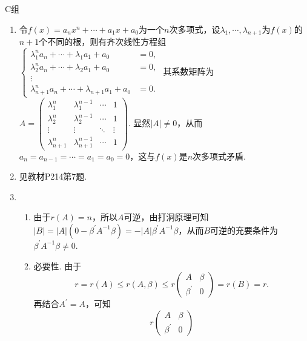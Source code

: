 \centerline{\heiti C组}
\begin{enumerate}
    \item
        令$f(x)=a_nx^n+\cdots+a_1x+a_0$为一个$n$次多项式，设$\lambda_1,\cdots,\lambda_{n+1}$为$f(x)$的$n+1$个不同的根，则有齐次线性方程组
        $\left\{\begin{array}{cl}
            \lambda_1^n a_n+\cdots+\lambda_1a_1+a_0&=0, \\
            \lambda_2^n a_n+\cdots+\lambda_2a_1+a_0&=0, \\
            \vdots& \\
            \lambda_{n+1}^n a_n+\cdots+\lambda_{n+1}a_1+a_0&=0.
        \end{array}\right.$
        其系数矩阵为
            $A=\begin{pmatrix}
                \lambda_1^n & \lambda_1^{n-1} & \cdots & 1 \\
                \lambda_2^n & \lambda_2^{n-1} & \cdots & 1 \\
                \vdots & \vdots & \ddots & \vdots \\
                \lambda_{n+1}^n & \lambda_{n+1}^{n-1} & \cdots & 1
            \end{pmatrix}$.
        显然$|A|\neq 0$，从而$a_n=a_{n-1}=\cdots=a_1=a_0=0$，这与$f(x)$是$n$次多项式矛盾.
    \item 见教材P214第7题.
    \item
        \begin{enumerate}
            \item
                由于$r(A)=n$，所以$A$可逆，由打洞原理可知$|B|=|A|(0-\beta^\prime A^{-1}\beta)=-|A|\beta^\prime A^{-1}\beta$，从而$B$可逆的充要条件为$\beta^\prime A^{-1}\beta\neq 0$.
            \item
                必要性. 由于
                \begin{equation*}
                    r=r(A)\leqslant r(A,\beta)\leqslant r\begin{pmatrix}
                        A & \beta \\
                        \beta^\prime & 0
                    \end{pmatrix}=r(B)=r.
                \end{equation*}
                再结合$A^\prime=A$，可知
                \begin{equation*}
                    r\begin{pmatrix}
                        A & \beta \\
                        \beta^\prime & 0

\end{pmatrix}
\end{equation*}
\end{enumerate}
\end{enumerate}
